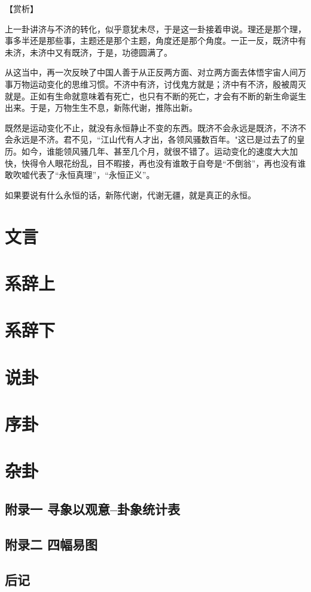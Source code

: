 \documentclass[a4paper,12pt,UTF8,twoside]{ctexbook}
\begin{document}
【赏析】

上一卦讲济与不济的转化，似乎意犹未尽，于是这一卦接着申说。理还是那个理，事多半还是那些事，主题还是那个主题，角度还是那个角度。一正一反，既济中有未济，未济中又有既济，于是，功德圆满了。

从这当中，再一次反映了中国人善于从正反两方面、对立两方面去体悟宇宙人间万事万物运动变化的思维习惯。不济中有济，讨伐鬼方就是；济中有不济，殷被周灭就是。正如有生命就意味着有死亡，也只有不断的死亡，才会有不断的新生命诞生出来。于是，万物生生不息，新陈代谢，推陈出新。

既然是运动变化不止，就没有永恒静止不变的东西。既济不会永远是既济，不济不会永远是不济。君不见，“江山代有人才出，各领风骚数百年。"这已是过去了的皇历。如今，谁能领风骚几年、甚至几个月，就很不错了。运动变化的速度大大加快，快得令人眼花纷乱，目不暇接，再也没有谁敢于自夸是“不倒翁”，再也没有谁敢吹嘘代表了“永恒真理”，“永恒正义”。

如果要说有什么永恒的话，新陈代谢，代谢无疆，就是真正的永恒。

\part{文言}
\part{系辞上}
\part{系辞下}
\part{说卦}
\part{序卦}
\part{杂卦}

\backmatter
\chapter{附录一 寻象以观意--卦象统计表}
\chapter{附录二 四幅易图}
\chapter{后记}
\end{document}
